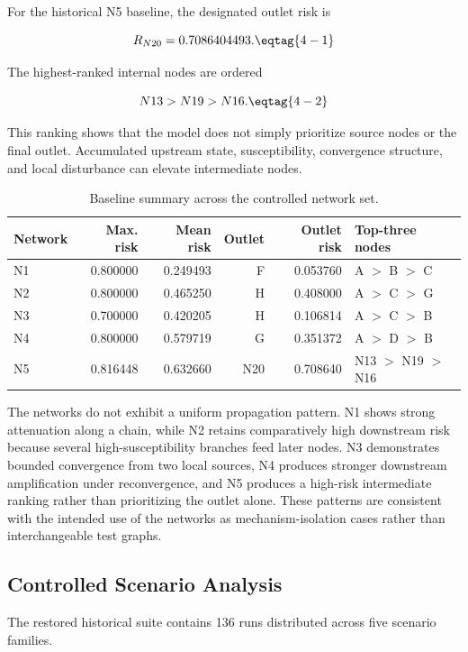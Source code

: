 For the historical N5 baseline, the designated outlet risk is

\[
R_{N20}=0.7086404493.
\eqtag{4-1}\]

The highest-ranked internal nodes are ordered

\[
N13>N19>N16.
\eqtag{4-2}\]

This ranking shows that the model does not simply prioritize source nodes
or the final outlet. Accumulated upstream state, susceptibility,
convergence structure, and local disturbance can elevate intermediate
nodes.

\begin{table}[H]
\centering
\caption{Baseline summary across the controlled network set.}
\label{tab:baseline-summary}
\small
\renewcommand{\arraystretch}{1.08}
\begin{tabular*}{\textwidth}{@{\extracolsep{\fill}}lrrrrl@{}}
\toprule
Network & Max. risk & Mean risk & Outlet & Outlet risk & Top-three nodes \\
\midrule
N1 & 0.800000 & 0.249493 & F   & 0.053760 & A $>$ B $>$ C \\
N2 & 0.800000 & 0.465250 & H   & 0.408000 & A $>$ C $>$ G \\
N3 & 0.700000 & 0.420205 & H   & 0.106814 & A $>$ C $>$ B \\
N4 & 0.800000 & 0.579719 & G   & 0.351372 & A $>$ D $>$ B \\
N5 & 0.816448 & 0.632660 & N20 & 0.708640 & N13 $>$ N19 $>$ N16 \\
\bottomrule
\end{tabular*}
\end{table}

The networks do not exhibit a uniform propagation pattern. N1 shows
strong attenuation along a chain, while N2 retains comparatively high
downstream risk because several high-susceptibility branches feed later
nodes. N3 demonstrates bounded convergence from two local sources, N4
produces stronger downstream amplification under reconvergence, and N5
produces a high-risk intermediate ranking rather than prioritizing the
outlet alone. These patterns are consistent with the intended use of the
networks as mechanism-isolation cases rather than interchangeable test
graphs.

\subsection{Controlled Scenario Analysis}

The restored historical suite contains 136 runs distributed across five
scenario families.

